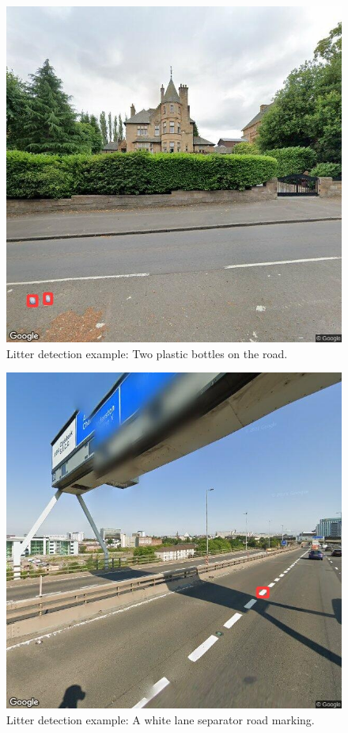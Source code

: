 \documentclass{thesis}
\begin{document}
\begin{appendices}
\begin{figure}[h!]
    \centering
    \includegraphics[scale=0.5]{images/good-two-bottles.jpg}
    \caption{Litter detection example: Two plastic bottles on the road.}
\end{figure}

\begin{figure}[h]
    \centering
    \includegraphics[scale=0.5]{images/flaw-road-marking.jpg}
    \caption{Litter detection example: A white lane separator road marking.}
\end{figure}


\end{appendices}
\end{document}
